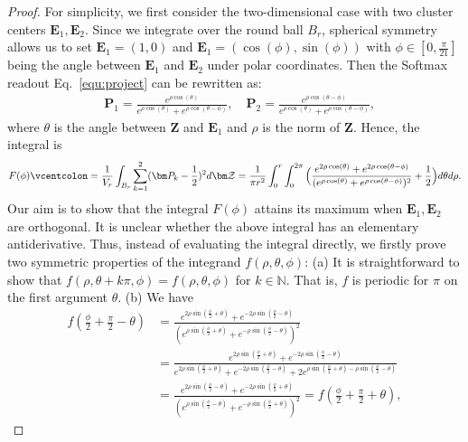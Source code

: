 \begin{proof}
	For simplicity, we first consider the two-dimensional case with two cluster centers $\bm E_1, \bm E_2$. Since we integrate over the round ball $B_r$, spherical symmetry allows us to set $\bm E_1 = (1,0)$ and $\bm E_1 = (\cos(\phi), \sin(\phi))$ with $\phi \in [0,\frac{\pi}{21}]$ being the angle between $\bm E_1$ and $\bm E_2$ under polar coordinates. Then the Softmax readout Eq.~\eqref{equ:project} can be rewritten as:
	\begin{align}
		& \bm P_1 = \frac{ e^{\rho \cos(\theta)} }{ e^{\rho \cos(\theta)} + e^{\rho \cos(\theta-\phi)} }, \quad \bm P_2 = \frac{ e^{\rho \cos(\theta-\phi)}  }{ e^{\rho \cos(\theta)} + e^{\rho \cos(\theta-\phi)} },
	\end{align}
	where $\theta$ is the angle between $\mathcal{\bm Z}$ and $\bm E_1$ and $\rho$ is the norm of $\mathcal{\bm Z}$. Hence, the integral is 
	\begin{align}
		F(\phi) \vcentcolon = \frac{1}{V_r} \int_{B_r} \sum_{k = 1}^2 (\bm P_k - \frac{1}{2})^2 d\mathcal{\bm Z} = \frac{1}{\pi r^2} \int_0^r \int_0^{2\pi} \Big( \frac{ e^{2\rho\cos(\theta)} + e^{2\rho\cos(\theta-\phi)}  }{ (e^{\rho\cos(\theta)} + e^{\rho\cos(\theta-\phi)} )^2 }  + \frac{1}{2} \Big) d\theta d\rho.
	\end{align}
	Our aim is to show that the integral $F(\phi)$ attains its maximum when $\bm E_1, \bm E_2$ are orthogonal. It is unclear whether the above integral has an elementary antiderivative. Thus, instead of evaluating the integral directly, we firstly prove two symmetric properties of the integrand $f(\rho,\theta,\phi)$: (a) It is straightforward to show that $f(\rho,\theta + k\pi, \phi) = f(\rho,\theta, \phi)$ for $k \in \mathbb{N}$. That is, $f$ is periodic for $\pi$ on the first argument $\theta$. (b) We have
	\begin{equation}
	\begin{aligned}
		f(\frac{\phi}{2} + \frac{\pi}{2} - \theta) & = \frac{e^{2\rho\sin(\frac{\phi}{2}+\theta)}+e^{-2\rho\sin(\frac{\phi}{2}-\theta)}}{(e^{\rho\sin(\frac{\phi}{2}+\theta)}+e^{-\rho\sin(\frac{\phi}{2}-\theta)})^2} \\
		& = \frac{e^{2\rho\sin(\frac{\phi}{2}+\theta)}+e^{-2\rho\sin(\frac{\phi}{2}-\theta)}}{e^{2\rho\sin(\frac{\phi}{2}+\theta)}+e^{-2\rho\sin(\frac{\phi}{2}-\theta)} + 2e^{\rho\sin(\frac{\phi}{2}+\theta)-\rho\sin(\frac{\phi}{2}-\theta)}} \\
		& =\frac{e^{2\rho\sin(\frac{\phi}{2}-\theta)}+e^{-2\rho\sin(\frac{\phi}{2}+\theta)}}{(e^{\rho\sin(\frac{\phi}{2}-\theta)}+e^{-\rho\sin(\frac{\phi}{2}+\theta)})^2} = f(\frac{\phi}{2}+\frac{\pi}{2}+\theta),

\end{aligned}
\end{equation}
\end{proof}
